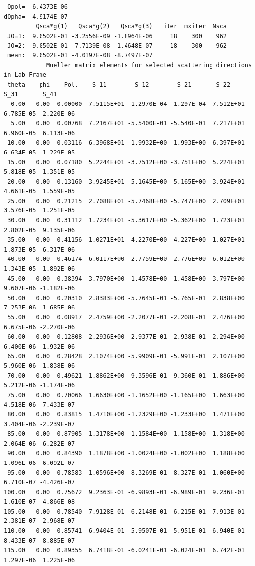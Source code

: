 \begin{appendix}
{\begin{verbatim}
 Qpol= -6.4373E-06                                                  dQpha= -4.9174E-07
         Qsca*g(1)   Qsca*g(2)   Qsca*g(3)   iter  mxiter  Nsca
 JO=1:  9.0502E-01 -3.2556E-09 -1.8964E-06     18    300    962
 JO=2:  9.0502E-01 -7.7139E-08  1.4648E-07     18    300    962
 mean:  9.0502E-01 -4.0197E-08 -8.7497E-07
            Mueller matrix elements for selected scattering directions in Lab Frame   
 theta    phi    Pol.    S_11        S_12        S_21       S_22       S_31       S_41
  0.00   0.00  0.00000  7.5115E+01 -1.2970E-04 -1.297E-04  7.512E+01  6.785E-05 -2.220E-06
  5.00   0.00  0.00768  7.2167E+01 -5.5400E-01 -5.540E-01  7.217E+01  6.960E-05  6.113E-06
 10.00   0.00  0.03116  6.3968E+01 -1.9932E+00 -1.993E+00  6.397E+01  6.634E-05  1.229E-05
 15.00   0.00  0.07180  5.2244E+01 -3.7512E+00 -3.751E+00  5.224E+01  5.818E-05  1.351E-05
 20.00   0.00  0.13160  3.9245E+01 -5.1645E+00 -5.165E+00  3.924E+01  4.661E-05  1.559E-05
 25.00   0.00  0.21215  2.7088E+01 -5.7468E+00 -5.747E+00  2.709E+01  3.576E-05  1.251E-05
 30.00   0.00  0.31112  1.7234E+01 -5.3617E+00 -5.362E+00  1.723E+01  2.802E-05  9.135E-06
 35.00   0.00  0.41156  1.0271E+01 -4.2270E+00 -4.227E+00  1.027E+01  1.873E-05  6.317E-06
 40.00   0.00  0.46174  6.0117E+00 -2.7759E+00 -2.776E+00  6.012E+00  1.343E-05  1.892E-06
 45.00   0.00  0.38394  3.7970E+00 -1.4578E+00 -1.458E+00  3.797E+00  9.607E-06 -1.182E-06
 50.00   0.00  0.20310  2.8383E+00 -5.7645E-01 -5.765E-01  2.838E+00  7.253E-06 -1.685E-06
 55.00   0.00  0.08917  2.4759E+00 -2.2077E-01 -2.208E-01  2.476E+00  6.675E-06 -2.270E-06
 60.00   0.00  0.12808  2.2936E+00 -2.9377E-01 -2.938E-01  2.294E+00  6.400E-06 -1.932E-06
 65.00   0.00  0.28428  2.1074E+00 -5.9909E-01 -5.991E-01  2.107E+00  5.960E-06 -1.838E-06
 70.00   0.00  0.49621  1.8862E+00 -9.3596E-01 -9.360E-01  1.886E+00  5.212E-06 -1.174E-06
 75.00   0.00  0.70066  1.6630E+00 -1.1652E+00 -1.165E+00  1.663E+00  4.518E-06 -7.433E-07
 80.00   0.00  0.83815  1.4710E+00 -1.2329E+00 -1.233E+00  1.471E+00  3.404E-06 -2.239E-07
 85.00   0.00  0.87905  1.3178E+00 -1.1584E+00 -1.158E+00  1.318E+00  2.064E-06 -6.282E-07
 90.00   0.00  0.84390  1.1878E+00 -1.0024E+00 -1.002E+00  1.188E+00  1.096E-06 -6.092E-07
 95.00   0.00  0.78583  1.0596E+00 -8.3269E-01 -8.327E-01  1.060E+00  6.710E-07 -4.426E-07
100.00   0.00  0.75672  9.2363E-01 -6.9893E-01 -6.989E-01  9.236E-01  1.610E-07 -4.866E-08
105.00   0.00  0.78540  7.9128E-01 -6.2148E-01 -6.215E-01  7.913E-01  2.381E-07  2.968E-07
110.00   0.00  0.85741  6.9404E-01 -5.9507E-01 -5.951E-01  6.940E-01  8.433E-07  8.885E-07
115.00   0.00  0.89355  6.7418E-01 -6.0241E-01 -6.024E-01  6.742E-01  1.297E-06  1.225E-06

\end{verbatim}}
\end{appendix}
